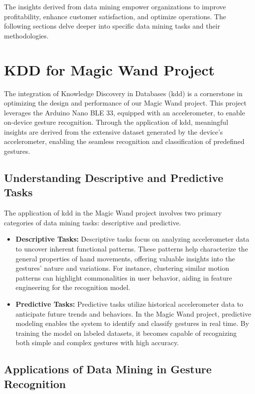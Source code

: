The insights derived from data mining empower organizations to improve profitability, enhance customer satisfaction, and optimize operations. The following sections delve deeper into specific data mining tasks and their methodologies.
	
\section{KDD for Magic Wand Project}
	
	The integration of Knowledge Discovery in Databases (\ac{kdd}) is a cornerstone in optimizing the design and performance of our Magic Wand project. This project leverages the Arduino Nano BLE 33, equipped with an accelerometer, to enable on-device gesture recognition. Through the application of \ac{kdd}, meaningful insights are derived from the extensive dataset generated by the device's accelerometer, enabling the seamless recognition and classification of predefined gestures.
	
	\subsection{Understanding Descriptive and Predictive Tasks}
	
	The application of \ac{kdd} in the Magic Wand project involves two primary categories of data mining tasks: descriptive and predictive.
	
	\begin{itemize}
		\item \textbf{Descriptive Tasks:}  
		Descriptive tasks focus on analyzing accelerometer data to uncover inherent functional patterns. These patterns help characterize the general properties of hand movements, offering valuable insights into the gestures' nature and variations. For instance, clustering similar motion patterns can highlight commonalities in user behavior, aiding in feature engineering for the recognition model.
		
		\item \textbf{Predictive Tasks:}  
		Predictive tasks utilize historical accelerometer data to anticipate future trends and behaviors. In the Magic Wand project, predictive modeling enables the system to identify and classify gestures in real time. By training the model on labeled datasets, it becomes capable of recognizing both simple and complex gestures with high accuracy.
	\end{itemize}
	
	\subsection{Applications of Data Mining in Gesture Recognition}
	
